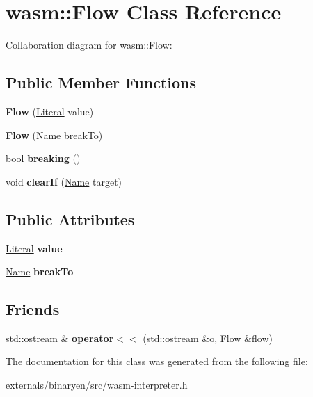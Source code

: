 \hypertarget{classwasm_1_1_flow}{}\section{wasm\+:\+:Flow Class Reference}
\label{classwasm_1_1_flow}


Collaboration diagram for wasm\+:\+:Flow\+:
\subsection*{Public Member Functions}
\begin{DoxyCompactItemize}
\item 
\mbox{\label{classwasm_1_1_flow_a29461898958b1441a920b403b1549fd8}} 
{\bfseries Flow} (\mbox{\hyperlink{classwasm_1_1_literal}{Literal}} value)
\item 
\mbox{\label{classwasm_1_1_flow_ac922976cd42242c39bedb529b94a0fe2}} 
{\bfseries Flow} (\mbox{\hyperlink{structwasm_1_1_name}{Name}} break\+To)
\item 
\mbox{\label{classwasm_1_1_flow_a39e8986c2bc87c26bfe4e1fc003cec8e}} 
bool {\bfseries breaking} ()
\item 
\mbox{\label{classwasm_1_1_flow_ad25c57370e9fd89074f1c32c5ada9647}} 
void {\bfseries clear\+If} (\mbox{\hyperlink{structwasm_1_1_name}{Name}} target)
\end{DoxyCompactItemize}
\subsection*{Public Attributes}
\begin{DoxyCompactItemize}
\item 
\mbox{\label{classwasm_1_1_flow_ad10ba5330330bc641537e599986053af}} 
\mbox{\hyperlink{classwasm_1_1_literal}{Literal}} {\bfseries value}
\item 
\mbox{\label{classwasm_1_1_flow_ac187c64b555a3debedb160bb9e61b985}} 
\mbox{\hyperlink{structwasm_1_1_name}{Name}} {\bfseries break\+To}
\end{DoxyCompactItemize}
\subsection*{Friends}
\begin{DoxyCompactItemize}
\item 
\mbox{\label{classwasm_1_1_flow_a6d2cc285aa6932681d573fd19f658692}} 
std\+::ostream \& {\bfseries operator$<$$<$} (std\+::ostream \&o, \mbox{\hyperlink{classwasm_1_1_flow}{Flow}} \&flow)
\end{DoxyCompactItemize}


The documentation for this class was generated from the following file\+:\begin{DoxyCompactItemize}
\item 
externals/binaryen/src/wasm-\/interpreter.\+h\end{DoxyCompactItemize}
